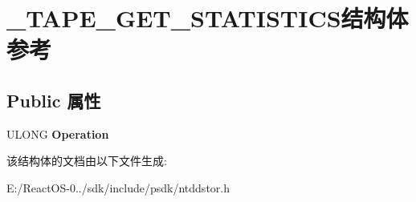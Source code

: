 \hypertarget{struct___t_a_p_e___g_e_t___s_t_a_t_i_s_t_i_c_s}{}\section{\+\_\+\+T\+A\+P\+E\+\_\+\+G\+E\+T\+\_\+\+S\+T\+A\+T\+I\+S\+T\+I\+C\+S结构体 参考}
\label{struct___t_a_p_e___g_e_t___s_t_a_t_i_s_t_i_c_s}
\subsection*{Public 属性}
\begin{DoxyCompactItemize}
\item 
\mbox{\label{struct___t_a_p_e___g_e_t___s_t_a_t_i_s_t_i_c_s_a6bb32c22cbe1e38e6f0c69cabdb13933}} 
U\+L\+O\+NG {\bfseries Operation}
\end{DoxyCompactItemize}


该结构体的文档由以下文件生成\+:\begin{DoxyCompactItemize}
\item 
E\+:/\+React\+O\+S-\/0../sdk/include/psdk/ntddstor.\+h\end{DoxyCompactItemize}
